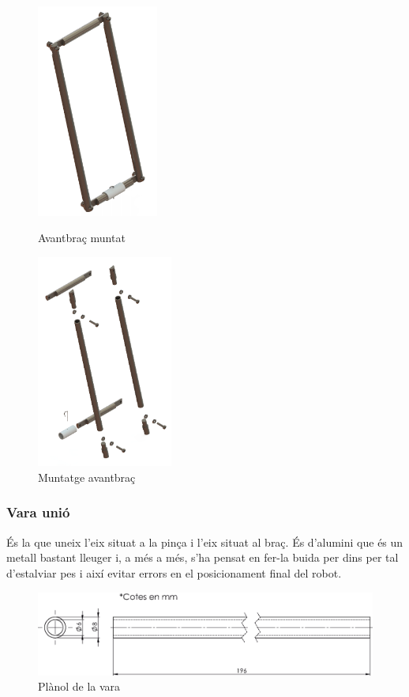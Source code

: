 \begin{figure}[h!]
\begin{minipage}[b]{.45\linewidth}
\centering
\includegraphics[height=7cm]{./imgComp/avant}
\caption{Avantbraç muntat}
\end{minipage}
\begin{minipage}[b]{.45\linewidth}
\centering
\includegraphics[height=7cm]{./imgComp/avant_expl}
\caption{Muntatge avantbraç}
\end{minipage}
\end{figure}

\subsubsection{Vara unió}
És la que uneix l'eix situat a la pinça i l'eix situat al braç. És d'alumini que és un metall bastant lleuger i, a més a més, s'ha pensat en fer-la buida per dins per tal d'estalviar pes i així evitar errors en el posicionament final del robot.
\begin{figure}[h!]
\centering
\includegraphics[width=15cm]{./sketch/vara}
\caption{Plànol de la vara}
\end{figure}


